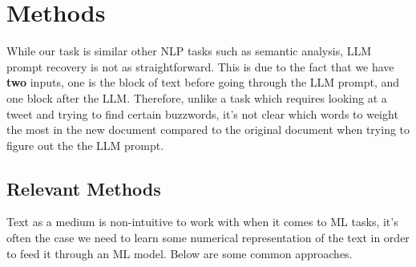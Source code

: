 \documentclass{article}
\begin{document}
\section{Methods}
While our task is similar other NLP tasks such as semantic analysis, LLM prompt recovery is not as straightforward. This is due to the fact that we have \textbf{two} inputs, one is the block of text before going through the LLM prompt, and one block after the LLM. Therefore, unlike a task which requires looking at a tweet and trying to find certain buzzwords, it's not clear which words to weight the most in the new document compared to the original document when trying to figure out the the LLM prompt.

\subsection{Relevant Methods}
Text as a medium is non-intuitive to work with when it comes to ML tasks, it's often the case we need to learn some numerical representation of the text in order to feed it through an ML model. Below are some common approaches.
\end{document}
